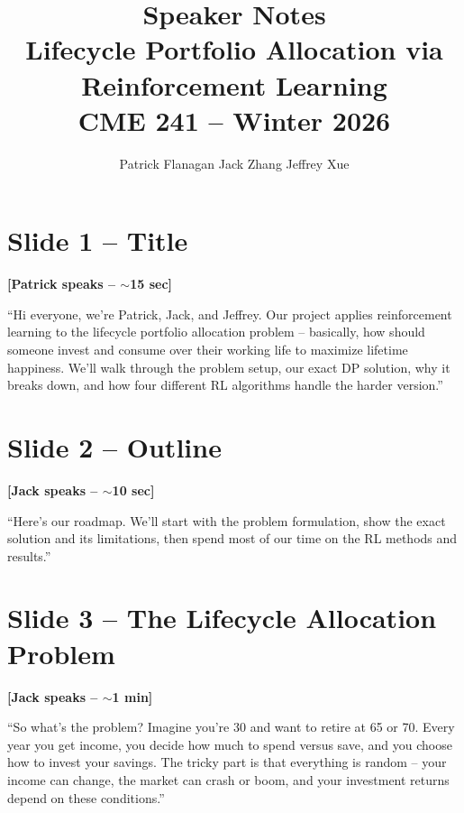 \documentclass[11pt, letterpaper]{article}
\title{\textbf{Speaker Notes}\\[0.3em]
\large Lifecycle Portfolio Allocation via Reinforcement Learning\\
CME 241 -- Winter 2026}
\author{Patrick Flanagan \quad Jack Zhang \quad Jeffrey Xue}
\date{}
\begin{document}
\maketitle
\tableofcontents
\newpage

\section{Slide 1 -- Title}

\textbf{[Patrick speaks -- $\sim$15 sec]}

``Hi everyone, we're Patrick, Jack, and Jeffrey. Our project applies reinforcement learning to the lifecycle portfolio allocation problem -- basically, how should someone invest and consume over their working life to maximize lifetime happiness. We'll walk through the problem setup, our exact DP solution, why it breaks down, and how four different RL algorithms handle the harder version.''

\section{Slide 2 -- Outline}

\textbf{[Jack speaks -- $\sim$10 sec]}

``Here's our roadmap. We'll start with the problem formulation, show the exact solution and its limitations, then spend most of our time on the RL methods and results.''

\section{Slide 3 -- The Lifecycle Allocation Problem}

\textbf{[Jack speaks -- $\sim$1 min]}

``So what's the problem? Imagine you're 30 and want to retire at 65 or 70. Every year you get income, you decide how much to spend versus save, and you choose how to invest your savings. The tricky part is that everything is random -- your income can change, the market can crash or boom, and your investment returns depend on these conditions.''
\end{document}
